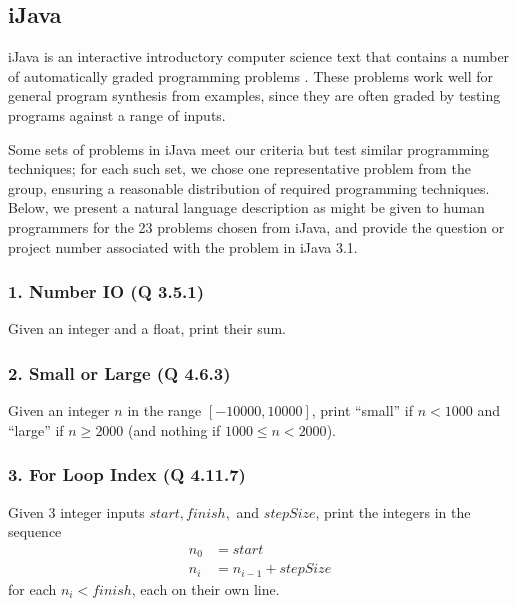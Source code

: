 \documentclass{sig-alternate}
\begin{document}
\subsection{iJava}


iJava is an interactive introductory computer science text that contains a number of automatically graded programming problems \cite{iJava, Moll:2011:IOI:1968521.1968535}. These problems work well for general program synthesis from examples, since they are often graded by testing programs against a range of inputs.

Some sets of problems in iJava meet our criteria but test similar programming techniques; for each such set, we chose one representative problem from the group, ensuring a reasonable distribution of required programming techniques. Below, we present a natural language description as might be given to human programmers for the 23 problems chosen from iJava, and provide the question or project number associated with the problem in iJava 3.1.


\subsubsection*{1. Number IO (Q 3.5.1)}
Given an integer and a float, print their sum.

\subsubsection*{2. Small or Large (Q 4.6.3)}
Given an integer $n$ in the range $[-10000, 10000]$, print ``small'' if $n < 1000$ and ``large'' if $n \ge 2000$ (and nothing if $1000 \le n < 2000$).

\subsubsection*{3. For Loop Index (Q 4.11.7)}
Given 3 integer inputs $start, finish,$ and $stepSize$, print the integers in the sequence
\begin{align*}
n_0 &= start \\
n_i &= n_{i-1} + stepSize
\end{align*}
for each $n_i < finish$, each on their own line.

\end{document}
